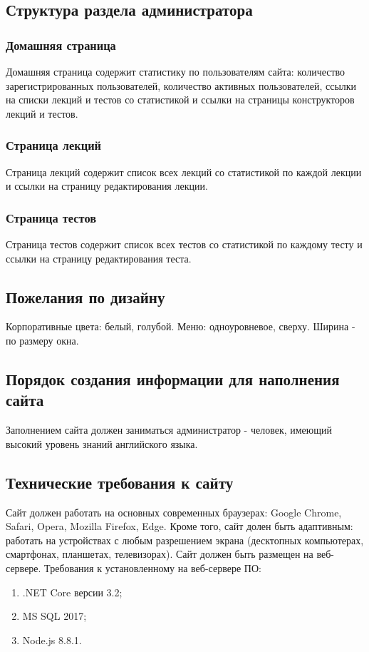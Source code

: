 \documentclass[a4paper,14pt]{extarticle}
\begin{document}
\subsection{Структура раздела администратора}
\subsubsection{Домашняя страница}
Домашняя страница содержит статистику по пользователям сайта: количество зарегистрированных пользователей, количество активных пользователей,
ссылки на списки лекций и тестов со статистикой и ссылки на страницы конструкторов лекций и тестов.

\subsubsection{Страница лекций}
Страница лекций содержит список всех лекций со статистикой по каждой лекции и ссылки на страницу редактирования лекции.

\subsubsection{Страница тестов}
Страница тестов содержит список всех тестов со статистикой по каждому тесту и ссылки на страницу редактирования теста.

\subsection{Пожелания по дизайну}
Корпоративные цвета: белый, голубой. Меню: одноуровневое, сверху. Ширина - по размеру окна.

\subsection{Порядок создания информации для наполнения сайта}
Заполнением сайта должен заниматься администратор - человек, имеющий высокий уровень знаний английского языка.

\subsection{Технические требования к сайту}
Сайт должен работать на основных современных браузерах: Google Chrome, Safari, Opera, Mozilla Firefox, Edge.
Кроме того, сайт долен быть адаптивным: работать на устройствах с любым разрешением экрана (десктопных компьютерах,
смартфонах, планшетах, телевизорах).
Сайт должен быть размещен на веб-сервере. Требования к установленному на веб-сервере ПО:
\begin{enumerate}
    \item .NET Core версии 3.2;
    \item MS SQL 2017;
    \item Node.js 8.8.1.
\end{enumerate}
\end{document}
